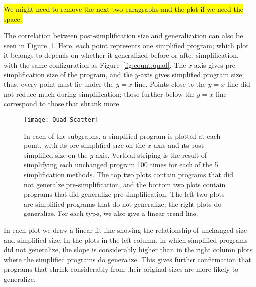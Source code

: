 \hl{We might need to remove the next two paragraphs and the plot if we need the space.}

The correlation between post-simplification size and generalization can also be seen in Figure~\ref{fig:nic-plot}. Here, each point represents one simplified program; which plot it belongs to depends on whether it generalized before or after simplification, with the same configuration as Figure~\ref{fig:count:quad}. The $x$-axis gives pre-simplification size of the program, and the $y$-axis gives simplified program size; thus, every point must lie under the $y = x$ line. Points close to the $y = x$ line did not reduce much during simplification; those further below the $y = x$ line correspond to those that shrank more.

\begin{figure}[t] %
\centering
\texttt{[image: Quad\_Scatter]} %
\caption{In each of the subgraphs, a simplified program is plotted at each point, with its pre-simplified size on the $x$-axis and its post-simplified size on the $y$-axis. Vertical striping is the result of simplifying each unchanged program 100 times for each of the 5 simplification methods. The top two plots contain programs that did not generalze pre-simplification, and the bottom two plots contain programs that did generalize pre-simplification. The left two plots are simplified programs that do not generalize; the right plots do generalize. For each type, we also give a linear trend line.}
\label{fig:nic-plot}
\end{figure}

In each plot we draw a linear fit line showing the relationship of unchanged size and simplified size. In the plots in the left column, in which simplified programs did not generalize, the slope is considerably higher than in the right column plots where the simplified programs do generalize. This gives further confirmation that programs that shrink considerably from their original sizes are more likely to generalize.



